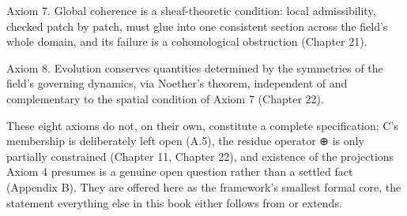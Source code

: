 Axiom 7. Global coherence is a sheaf-theoretic condition: local admissibility, checked patch by patch, must glue into one consistent section across the field's whole domain, and its failure is a cohomological obstruction (Chapter 21).

Axiom 8. Evolution conserves quantities determined by the symmetries of the field's governing dynamics, via Noether's theorem, independent of and complementary to the spatial condition of Axiom 7 (Chapter 22).

These eight axioms do not, on their own, constitute a complete specification; C's membership is deliberately left open (A.5), the residue operator ⊕ is only partially constrained (Chapter 11, Chapter 22), and existence of the projections Axiom 4 presumes is a genuine open question rather than a settled fact (Appendix B). They are offered here as the framework's smallest formal core, the statement everything else in this book either follows from or extends.
